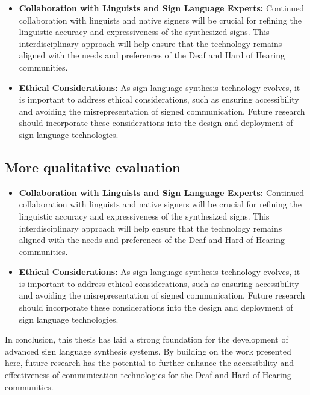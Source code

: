 \documentclass[../../main.tex]{subfiles}
\begin{document}
\begin{itemize}
    \item \textbf{Collaboration with Linguists and Sign Language Experts:} Continued collaboration with linguists and native signers will be crucial for refining the linguistic accuracy and expressiveness of the synthesized signs. This interdisciplinary approach will help ensure that the technology remains aligned with the needs and preferences of the Deaf and Hard of Hearing communities.
    
    \item \textbf{Ethical Considerations:} As sign language synthesis technology evolves, it is important to address ethical considerations, such as ensuring accessibility and avoiding the misrepresentation of signed communication. Future research should incorporate these considerations into the design and deployment of sign language technologies.
\end{itemize}

\subsection{More qualitative evaluation}
\label{ch:conclusion:future:evaluation}

\begin{itemize}
    \item \textbf{Collaboration with Linguists and Sign Language Experts:} Continued collaboration with linguists and native signers will be crucial for refining the linguistic accuracy and expressiveness of the synthesized signs. This interdisciplinary approach will help ensure that the technology remains aligned with the needs and preferences of the Deaf and Hard of Hearing communities.
    
    \item \textbf{Ethical Considerations:} As sign language synthesis technology evolves, it is important to address ethical considerations, such as ensuring accessibility and avoiding the misrepresentation of signed communication. Future research should incorporate these considerations into the design and deployment of sign language technologies.
\end{itemize}


In conclusion, this thesis has laid a strong foundation for the development of advanced sign language synthesis systems. By building on the work presented here, future research has the potential to further enhance the accessibility and effectiveness of communication technologies for the Deaf and Hard of Hearing communities.
\end{document}
